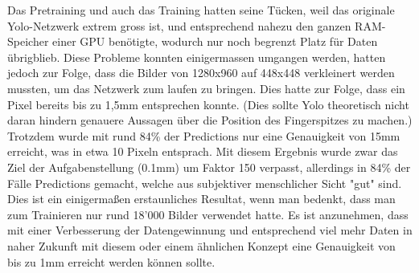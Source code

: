 Das Pretraining und auch das Training hatten seine Tücken, weil das originale Yolo-Netzwerk extrem gross ist, und entsprechend nahezu den ganzen RAM-Speicher einer GPU benötigte, wodurch nur noch begrenzt Platz für Daten übrigblieb. 
Diese Probleme konnten einigermassen umgangen werden, hatten jedoch zur Folge, dass die Bilder von 1280x960 auf 448x448 verkleinert werden mussten, um das Netzwerk zum laufen zu bringen. 
Dies hatte zur Folge, dass ein Pixel bereits bis zu 1,5mm entsprechen konnte. (Dies sollte Yolo theoretisch nicht daran hindern genauere Aussagen über die Position des Fingerspitzes zu machen.) 
Trotzdem wurde mit rund 84\% der Predictions nur eine Genauigkeit von 15mm erreicht, was in etwa 10 Pixeln entsprach. 
Mit diesem Ergebnis wurde zwar das Ziel der Aufgabenstellung (0.1mm) um Faktor 150 verpasst, allerdings in 84\% der Fälle Predictions gemacht, welche aus subjektiver menschlicher Sicht "gut" sind. 
Dies ist ein einigermaßen erstaunliches Resultat, wenn man bedenkt, dass man zum Trainieren nur rund 18'000 Bilder verwendet hatte. 
Es ist anzunehmen, dass mit einer Verbesserung der Datengewinnung und entsprechend viel mehr Daten in naher Zukunft mit diesem oder einem ähnlichen Konzept eine Genauigkeit von bis zu 1mm erreicht werden können sollte.
